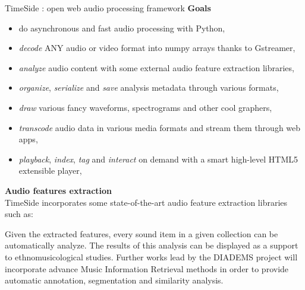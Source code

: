 \documentclass[final, hyperref, table]{beamer}
\begin{document}
\begin{frame}[containsverbatim]{}
\begin{columns}[t]
\begin{column}[T]{.49\linewidth}
\begin{block}{TimeSide : open web audio processing framework}
\textbf{Goals}\\

\begin{itemize}
\item do asynchronous and fast audio processing with Python,
\item \emph{decode} ANY audio or video format into numpy arrays thanks to Gstreamer,
\item \emph{analyze} audio content with some external audio feature extraction libraries,
\item \emph{organize}, \emph{serialize} and \emph{save} analysis metadata through various formats,
\item \emph{draw} various fancy waveforms, spectrograms and other cool graphers,
\item \emph{transcode} audio data in various media formats and stream them through web apps,
\item \emph{playback}, \emph{index}, \emph{tag} and \emph{interact} on demand with a smart high-level HTML5 extensible player,
\end{itemize}

\textbf{Audio features extraction}\\
TimeSide incorporates some state-of-the-art audio feature extraction libraries such as:



Given the extracted features, every sound item in a given collection can be automatically analyze. The results of this analysis can be displayed as a support to ethnomusicological studies.
Further works lead by the DIADEMS project will incorporate advance Music Information Retrieval methods in order to provide automatic annotation, segmentation and similarity analysis.
\end{block}
\end{column}
\end{columns}
\end{frame}
\end{document}
